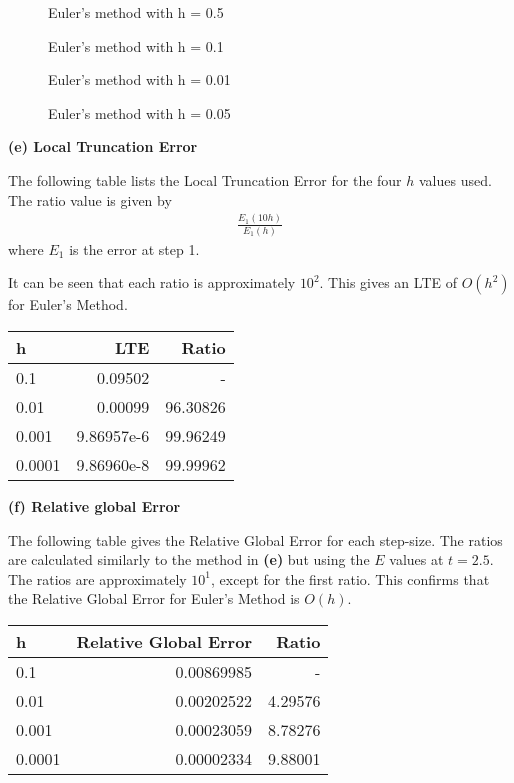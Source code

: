 \documentclass[a4paper,11pt]{article}
\begin{document}
\begin{figure}[H]
\caption{Euler's method with h = 0.5}\label{figE0.5}
\end{figure}

\begin{figure}[H]
\caption{Euler's method with h = 0.1}\label{figE0.1}
\end{figure}

\begin{figure}[H]
\caption{Euler's method with h = 0.01}\label{figE0.05}
\end{figure}

\begin{figure}[H]
\caption{Euler's method with h = 0.05}\label{figE0.01}
\end{figure}

\textbf{(e) Local Truncation Error}

The following table lists the Local Truncation Error for the four $h$ values used. The ratio value is given by
\begin{align*}
\frac{E_1(10h)}{E_1(h)}
\end{align*}
where $E_1$ is the error at step 1.

It can be seen that each ratio is approximately $10^2$. This gives an LTE of $O(h^2)$ for Euler's Method.
\begin{center}
\begin{tabular}{|l|r|r|}
\hline
h & LTE & Ratio\\
\hline
0.1    & 0.09502 &  -\\
0.01   & 0.00099 & 96.30826\\
0.001  & 9.86957e-6 & 99.96249\\
0.0001 & 9.86960e-8 & 99.99962\\
\hline 
\end{tabular}
\end{center}

\textbf{(f) Relative global Error}

The following table gives the Relative Global Error for each step-size. The ratios are calculated similarly to the method in \textbf{(e)} but using the $E$ values at $t = 2.5$. The ratios are approximately $10^1$, except for the first ratio. This confirms that the Relative Global Error for Euler's Method is $O(h)$.
\begin{center}
\begin{tabular}{|l|r|r|}
\hline
h & Relative Global Error & Ratio\\
\hline
0.1    & 0.00869985 &  -\\
0.01   & 0.00202522 & 4.29576\\
0.001  & 0.00023059 & 8.78276\\
0.0001 & 0.00002334 & 9.88001\\
\hline 
\end{tabular}
\end{center}
\end{document}
